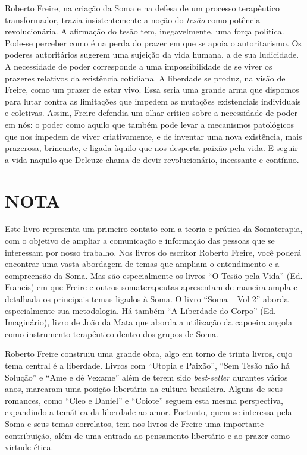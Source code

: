 Roberto Freire, na criação da Soma e na defesa de um processo
terapêutico transformador, trazia insistentemente a noção do
\emph{tesão} como potência revolucionária. A afirmação do tesão tem,
inegavelmente, uma força política. Pode-se perceber como é na perda do
prazer em que se apoia o autoritarismo. Os poderes autoritários sugerem
uma sujeição da vida humana, a de sua ludicidade. A necessidade de poder
corresponde a uma impossibilidade de se viver os prazeres relativos da
existência cotidiana. A liberdade se produz, na visão de Freire, como um
prazer de estar vivo. Essa seria uma grande arma que dispomos para lutar
contra as limitações que impedem as mutações existenciais individuais e
coletivas. Assim, Freire defendia um olhar crítico sobre a necessidade
de poder em nós: o poder como aquilo que também pode levar a mecanismos
patológicos que nos impedem de viver criativamente, e de inventar uma
nova existência, mais prazerosa, brincante, e ligada àquilo que nos
desperta paixão pela vida. E seguir a vida naquilo que Deleuze chama de
devir revolucionário, incessante e contínuo.

\chapter{NOTA}

Este livro representa um primeiro contato com a teoria e prática da
Somaterapia, com o objetivo de ampliar a comunicação e informação das
pessoas que se interessam por nosso trabalho. Nos livros do escritor
Roberto Freire, você poderá encontrar uma vasta abordagem de temas que
ampliam o entendimento e a compreensão da Soma. Mas são especialmente os
livros ``O Tesão pela Vida'' (Ed. Francis) em que Freire e outros
somaterapeutas apresentam de maneira ampla e detalhada os principais
temas ligados à Soma. O livro ``Soma -- Vol 2'' aborda especialmente sua
metodologia. Há também ``A Liberdade do Corpo'' (Ed. Imaginário), livro
de João da Mata que aborda a utilização da capoeira angola como
instrumento terapêutico dentro dos grupos de Soma.

Roberto Freire construiu uma grande obra, algo em torno de trinta
livros, cujo tema central é a liberdade. Livros com ``Utopia e Paixão'',
``Sem Tesão não há Solução'' e ``Ame e dê Vexame'' além de terem sido
\emph{best-seller} durantes vários anos, marcaram uma posição libertária
na cultura brasileira. Alguns de seus romances, como ``Cleo e Daniel'' e
``Coiote'' seguem esta mesma perspectiva, expandindo a temática da
liberdade ao amor. Portanto, quem se interessa pela Soma e seus temas
correlatos, tem nos livros de Freire uma importante contribuição, além
de uma entrada ao pensamento libertário e ao prazer como virtude ética.

